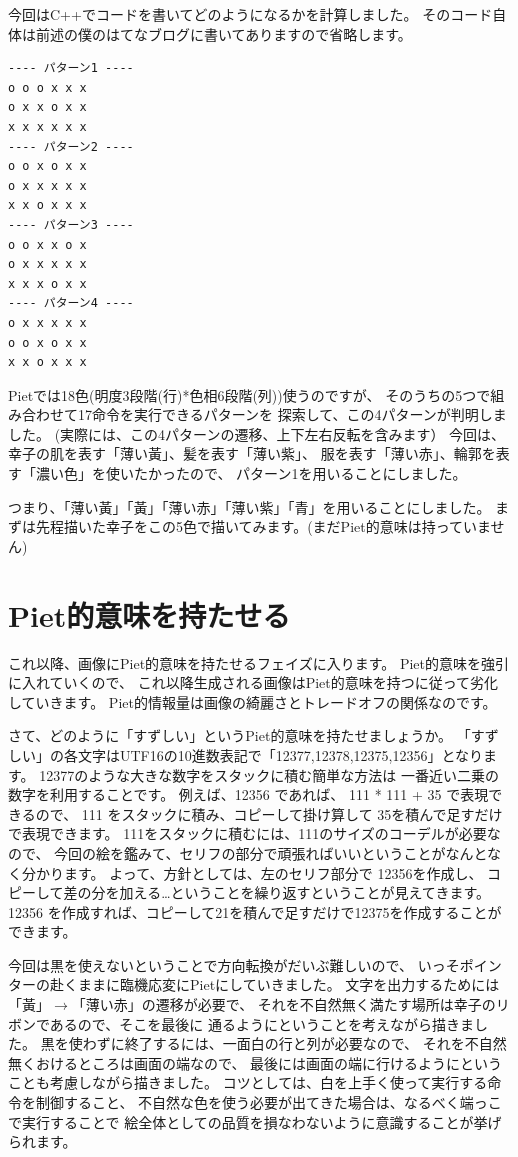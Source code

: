 今回はC++でコードを書いてどのようになるかを計算しました。
そのコード自体は前述の僕のはてなブログに書いてありますので省略します。

\begin{verbatim}
---- パターン1 ----
o o o x x x
o x x o x x
x x x x x x
---- パターン2 ----
o o x o x x
o x x x x x
x x o x x x
---- パターン3 ----
o o x x o x
o x x x x x
x x x o x x
---- パターン4 ----
o x x x x x
o o x o x x
x x o x x x
\end{verbatim}

Pietでは18色(明度3段階(行)*色相6段階(列))使うのですが、
そのうちの5つで組み合わせて17命令を実行できるパターンを
探索して、この4パターンが判明しました。
(実際には、この4パターンの遷移、上下左右反転を含みます）
今回は、幸子の肌を表す「薄い黃」、髪を表す「薄い紫」、
服を表す「薄い赤」、輪郭を表す「濃い色」を使いたかったので、
パターン1を用いることにしました。

つまり、「薄い黃」「黃」「薄い赤」「薄い紫」「青」を用いることにしました。
まずは先程描いた幸子をこの5色で描いてみます。(まだPiet的意味は持っていません)


\section{Piet的意味を持たせる}

これ以降、画像にPiet的意味を持たせるフェイズに入ります。
Piet的意味を強引に入れていくので、
これ以降生成される画像はPiet的意味を持つに従って劣化していきます。
Piet的情報量は画像の綺麗さとトレードオフの関係なのです。

さて、どのように「すずしい」というPiet的意味を持たせましょうか。
「すずしい」の各文字はUTF16の10進数表記で「12377,12378,12375,12356」となります。
12377のような大きな数字をスタックに積む簡単な方法は
一番近い二乗の数字を利用することです。 例えば、12356 であれば、 111 *
111 + 35 で表現できるので、 111 をスタックに積み、コピーして掛け算して
35を積んで足すだけで表現できます。
111をスタックに積むには、111のサイズのコーデルが必要なので、
今回の絵を鑑みて、セリフの部分で頑張ればいいということがなんとなく分かります。
よって、方針としては、左のセリフ部分で 12356を作成し、
コピーして差の分を加える\ldots{}ということを繰り返すということが見えてきます。
12356
を作成すれば、コピーして21を積んで足すだけで12375を作成することができます。

今回は黒を使えないということで方向転換がだいぶ難しいので、
いっそポインターの赴くままに臨機応変にPietにしていきました。
文字を出力するためには 「黃」$ \to $「薄い赤」の遷移が必要で、
それを不自然無く満たす場所は幸子のリボンであるので、そこを最後に
通るようにということを考えながら描きました。
黒を使わずに終了するには、一面白の行と列が必要なので、
それを不自然無くおけるところは画面の端なので、
最後には画面の端に行けるようにということも考慮しながら描きました。
コツとしては、白を上手く使って実行する命令を制御すること、
不自然な色を使う必要が出てきた場合は、なるべく端っこで実行することで
絵全体としての品質を損なわないように意識することが挙げられます。

